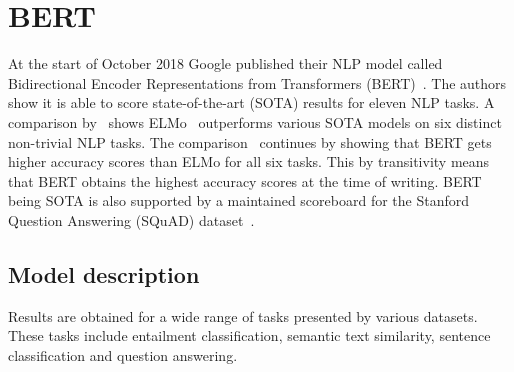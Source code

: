 \section{BERT}
\label{sec:bert}
At the start of October 2018 Google published their NLP model called Bidirectional Encoder Representations from Transformers (BERT)~\citep{devlin2018}.
The authors show it is able to score state-of-the-art (SOTA) results for eleven NLP tasks.
A comparison by~\citet{young2018recent} shows ELMo~\citep{peters2018} outperforms various SOTA models on six distinct non-trivial NLP tasks.
The comparison~\citep{young2018recent} continues by showing that BERT gets higher accuracy scores than ELMo for all six tasks.
This by transitivity means that BERT obtains the highest accuracy scores at the time of writing.
BERT being SOTA is also supported by a maintained scoreboard for the Stanford Question Answering (SQuAD) dataset~\citep{rajpurkar2019explorer}.

\subsection{Model description}
\label{subsec:model_description}
Results are obtained for a wide range of tasks presented by various datasets.
These tasks include entailment classification, semantic text similarity, sentence classification and question answering.

